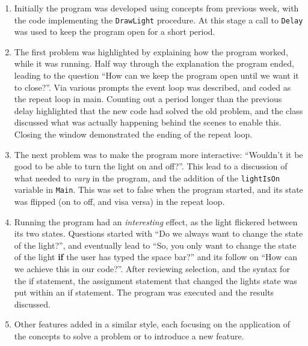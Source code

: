 \begin{enumerate}
  \item Initially the program was developed using concepts from previous week, with the code implementing the \texttt{DrawLight} procedure. At this stage a call to \texttt{Delay} was used to keep the program open for a short period.
  \item The first problem was highlighted by explaining how the program worked, while it was running. Half way through the explanation the program ended, leading to the question ``How can we keep the program open until we want it to close?''. Via various prompts the event loop was described, and coded as the repeat loop in main. Counting out a period longer than the previous delay highlighted that the new code had solved the old problem, and the class discussed what was actually happening behind the scenes to enable this. Closing the window demonstrated the ending of the repeat loop.
  \item The next problem was to make the program more interactive: ``Wouldn't it be good to be able to turn the light on and off?''. This lead to a discussion of what needed to \emph{vary} in the program, and the addition of the \texttt{lightIsOn} variable in \texttt{Main}. This was set to false when the program started, and its state was flipped (on to off, and visa versa) in the repeat loop.
  \item Running the program had an \emph{interesting} effect, as the light flickered between its two states. Questions started with ``Do we always want to change the state of the light?'', and eventually lead to ``So, you only want to change the state of the light \textbf{if} the user has typed the space bar?'' and its follow on ``How can we achieve this in our code?''. After reviewing selection, and the syntax for the if statement, the assignment statement that changed the lights state was put within an if statement. The program was executed and the results discussed.
  \item Other features added in a similar style, each focusing on the application of the concepts to solve a problem or to introduce a new feature.  
\end{enumerate}



